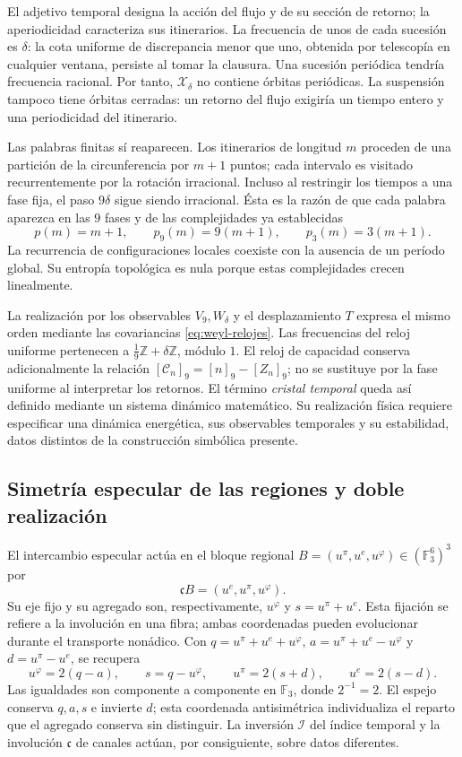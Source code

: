 El adjetivo temporal designa la acción del flujo y de su sección de retorno;
la aperiodicidad caracteriza sus itinerarios. La frecuencia de unos de cada
sucesión es \(\delta\): la cota uniforme de discrepancia menor que uno,
obtenida por telescopía en cualquier ventana, persiste al tomar la clausura.
Una sucesión periódica tendría frecuencia racional. Por tanto,
\(\mathcal X_\delta\) no contiene órbitas periódicas. La suspensión
tampoco tiene órbitas cerradas: un retorno del flujo exigiría un tiempo
entero y una periodicidad del itinerario.

Las palabras finitas sí reaparecen. Los itinerarios de longitud \(m\)
proceden de una partición de la circunferencia por \(m+1\) puntos; cada
intervalo es visitado recurrentemente por la rotación irracional. Incluso
al restringir los tiempos a una fase fija, el paso \(9\delta\) sigue
siendo irracional. Ésta es la razón de que cada palabra aparezca en las
\(9\) fases y de las complejidades ya establecidas
\[
 p(m)=m+1,\qquad p_9(m)=9(m+1),\qquad p_3(m)=3(m+1).
\]
La recurrencia de configuraciones locales coexiste con la ausencia de un
período global. Su entropía topológica es nula porque estas complejidades
crecen linealmente.

La realización por los observables \(V_9,W_\delta\) y el desplazamiento
\(T\) expresa el mismo orden mediante las covariancias
\eqref{eq:weyl-relojes}. Las frecuencias del reloj uniforme pertenecen a
\(\frac19\mathbb Z+\delta\mathbb Z\), módulo \(1\). El reloj de
capacidad conserva adicionalmente la relación
\([\mathcal C_n]_9=[n]_9-[Z_n]_9\); no se sustituye por la fase uniforme
al interpretar los retornos. El término \emph{cristal temporal} queda así
definido mediante un sistema dinámico matemático. Su realización física
requiere especificar una dinámica energética, sus observables temporales
y su estabilidad, datos distintos de la construcción simbólica presente.

\subsection{Simetría especular de las regiones y doble realización}
\label{mono-ampl:regiones}

El intercambio especular actúa en el bloque regional
\(B=(u^\pi,u^e,u^\varphi)\in(\mathbb F_3^6)^3\) por
\[
 \mathfrak cB=(u^e,u^\pi,u^\varphi).
\]
Su eje fijo y su agregado son, respectivamente, \(u^\varphi\) y
\(s=u^\pi+u^e\). Esta fijación se refiere a la involución en una fibra;
ambas coordenadas pueden evolucionar durante el transporte nonádico.
Con \(q=u^\pi+u^e+u^\varphi\),
\(a=u^\pi+u^e-u^\varphi\) y \(d=u^\pi-u^e\), se recupera
\[
 u^\varphi=2(q-a),\qquad s=q-u^\varphi,\qquad
 u^\pi=2(s+d),\qquad u^e=2(s-d).
\]
Las igualdades son componente a componente en \(\mathbb F_3\), donde
\(2^{-1}=2\). El espejo conserva \(q,a,s\) e invierte \(d\); esta
coordenada antisimétrica individualiza el reparto que el agregado conserva
sin distinguir. La inversión \(\mathcal I\) del índice temporal y la
involución \(\mathfrak c\) de canales actúan, por consiguiente, sobre
datos diferentes.

